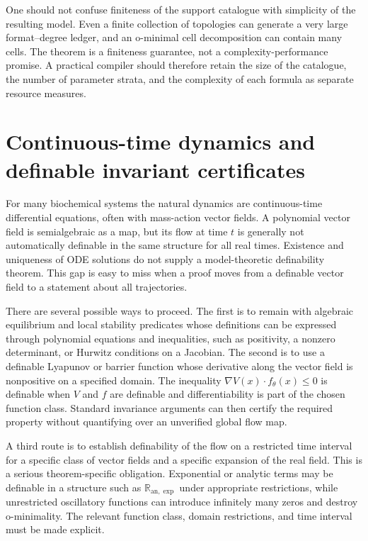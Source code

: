 \documentclass[11pt,a4paper]{article}
\theoremstyle{definition}
\theoremstyle{remark}
\newcommand{\R}{\mathbb{R}}
\begin{document}
One should not confuse finiteness of the support catalogue with simplicity of the resulting model. Even a finite collection of topologies can generate a very large format--degree ledger, and an o-minimal cell decomposition can contain many cells. The theorem is a finiteness guarantee, not a complexity-performance promise. A practical compiler should therefore retain the size of the catalogue, the number of parameter strata, and the complexity of each formula as separate resource measures.

\section{Continuous-time dynamics and definable invariant certificates}
For many biochemical systems the natural dynamics are continuous-time differential equations, often with mass-action vector fields. A polynomial vector field is semialgebraic as a map, but its flow at time \(t\) is generally not automatically definable in the same structure for all real times. Existence and uniqueness of ODE solutions do not supply a model-theoretic definability theorem. This gap is easy to miss when a proof moves from a definable vector field to a statement about all trajectories.

There are several possible ways to proceed. The first is to remain with algebraic equilibrium and local stability predicates whose definitions can be expressed through polynomial equations and inequalities, such as positivity, a nonzero determinant, or Hurwitz conditions on a Jacobian. The second is to use a definable Lyapunov or barrier function whose derivative along the vector field is nonpositive on a specified domain. The inequality \(\nabla V(x)\cdot f_\theta(x)\leq0\) is definable when \(V\) and \(f\) are definable and differentiability is part of the chosen function class. Standard invariance arguments can then certify the required property without quantifying over an unverified global flow map.

A third route is to establish definability of the flow on a restricted time interval for a specific class of vector fields and a specific expansion of the real field. This is a serious theorem-specific obligation. Exponential or analytic terms may be definable in a structure such as \(\R_{\mathrm{an},\exp}\) under appropriate restrictions, while unrestricted oscillatory functions can introduce infinitely many zeros and destroy o-minimality. The relevant function class, domain restrictions, and time interval must be made explicit.
\end{document}
